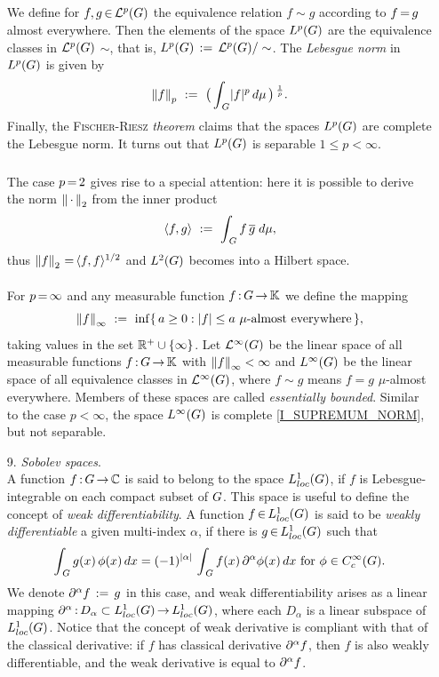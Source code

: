 \documentclass[11pt,twoside]{article}
\begin{document}
\begin{itemize}[leftmargin=12pt,itemsep=5pt]
\subparagraph{}
We define for $f,g \xeof \cal{L}^p(\G)$ the equivalence relation
$f \sim g$ according to $f \eq g$ almost everywhere.
Then the elements of the space $L^p(\G)$
are the equivalence classes in $\cal{L}^p(\G)$ {\wrt} $\sim$,
that is,
$L^p(\G) \eqdef \cal{L}^p(\G) / \sim$.
The \textit{Lebesgue norm} in $\Lp$ is given by
\[
\norm{f}_p
\, \eqdef \,
\big( \int_{\,\G} \abs{f} ^p \, d\mu \,\big) \, ^{\frac{1}{p}}.
\]
Finally,
the \textsc{Fischer-Riesz} \textit{theorem} claims
that the spaces $\Lp$ are complete {\wrt} the Lebesgue norm.
It turns out that $\Lp$ is separable \iff $1 \leq p < \infty$.

\subparagraph{} %
The case $p \eq 2$ gives rise to a special attention:
here it is possible to derive the norm $\norm{\,\cdot\,}_2$
from the inner product
\[
\scalar{f}{g} \, \eqdef \, \int_{\,\G} f \, \overline{g} \; d\mu,
\]
thus $\norm{f}_2 \eq \scalar{f}{f} ^{1/2}$
and $\Lh$ becomes into a Hilbert space.

\paragraph{}
For $p \eq \infty$ and any measurable function $f\:\G \xto \F$
we define the mapping
\begin{equation}\label{I_SUPREMUM_NORM}
\norm{f}_{\infty} \, \eqdef \, \inf
\{\,a \geq 0: \abs{f} \leq a \,\, \mu \mbox{-almost everywhere}\,\},
\end{equation}
taking values in the set $\R^+ \cup \{\infty\}$.
Let $\cal{L}^{\infty}(\G)$ be the linear space
of all measurable functions $f\:\G \xto \F$
with $\norm{f}_{\infty} < \infty$
and $\Li$ be the linear space of all equivalence classes
in $\cal{L}^{\infty}(\G)$,
where $f \sim g$ means $f=g$ $\mu$-almost everywhere.
Members of these spaces are called \textit{essentially bounded}.
Similar to the case $p < \infty$,
the space $\Li$ is complete {\wrt} \eqref{I_SUPREMUM_NORM},
but not separable.

\item[9.] \textit{Sobolev spaces}.\\
A function $f{\,:\,}G {\,\to\,} {\mathbb{C}}$ is said to belong to the space $L_{loc}^1(G)$,
if $f$ is Lebesgue-integrable on each compact subset of $G$.
This space is useful to define the concept of \textit{weak differentiability}.
A function $f {\,\in\,} L_{loc}^1(G)$ is said to be \textit{weakly differentiable}
{\wrt} a given multi-index $\alpha$,
if there is $g {\,\in\,} L_{loc}^1(G)$
such that 
\[
\int_{\,\G} g(x) \, \phi(x) \, dx
=
(-1)^{ \abs{\alpha} } \,
\int_{\,\G} f(x) \, \PA \phi(x) \, dx
\for \phi \in \TF.
\]
We denote $\partial^{\alpha} f \,:=\, g$ in this case,
and weak differentiability arises as a linear mapping
$\partial^{\alpha}{\,:\,}D_{\alpha} \subset L_{loc}^1(G) {\,\to\,} L_{loc}^1(G)$,
where each $D_{\alpha}$ is a linear subspace of $L_{loc}^1(G)$.
Notice that
the concept of weak derivative is compliant
with that of the classical derivative:
if $f$ has classical derivative $\partial^{\alpha} f$,
then $f$ is also weakly differentiable,
and the weak derivative is equal to $\partial^{\alpha} f$.


\end{itemize}
\end{document}
